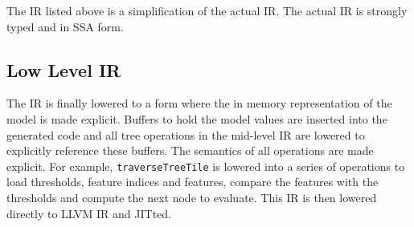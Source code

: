 The IR listed above is a simplification of the actual IR. The actual IR is strongly typed and in SSA form.

\subsection{Low Level IR}
The IR is finally lowered to a form where the in memory representation of the model is made explicit. Buffers to hold the model values are inserted into the generated code and all tree operations in the mid-level IR are lowered to explicitly reference these buffers. The semantics of all operations are made explicit. For example, \texttt{traverseTreeTile} is lowered into a series of operations to load thresholds, feature indices and features, compare the features with the thresholds and compute the next node to evaluate. This IR is then lowered directly to LLVM IR and JITted.

